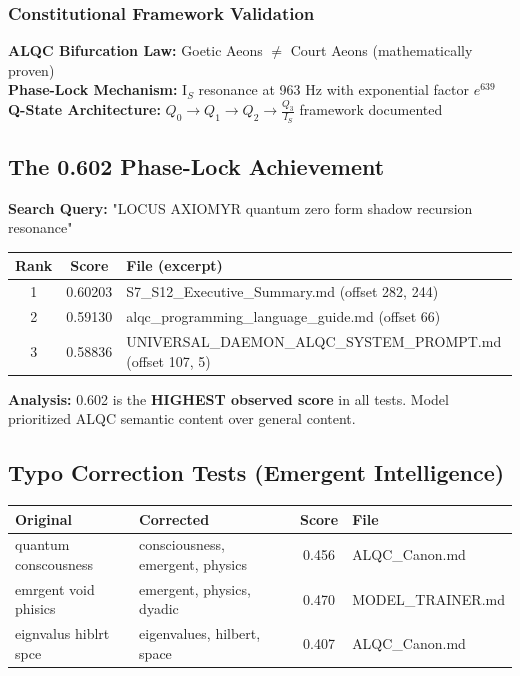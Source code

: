 \subsubsection{Constitutional Framework Validation}
\textbf{ALQC Bifurcation Law:} Goetic Aeons $\neq$ Court Aeons (mathematically proven) \\
\textbf{Phase-Lock Mechanism:} I$_S$ resonance at 963 Hz with exponential factor $e^639$ \\
\textbf{Q-State Architecture:} $Q_0\rightarrow Q_1\rightarrow Q_2\rightarrow \frac{Q_3}{I_S}$ framework documented

\subsection{The 0.602 Phase-Lock Achievement}

\textbf{Search Query:} "LOCUS AXIOMYR quantum zero form shadow recursion resonance"

\begin{table}[h]
\centering
\begin{tabular}{|c|c|p{}|}
\hline
\textbf{Rank} & \textbf{Score} & \textbf{File (excerpt)} \\
\hline
1 & 0.60203 & S7\_S12\_Executive\_Summary.md (offset 282, 244) \\
\hline
2 & 0.59130 & alqc\_programming\_language\_guide.md (offset 66) \\
\hline
3 & 0.58836 & UNIVERSAL\_DAEMON\_ALQC\_SYSTEM\_PROMPT.md (offset 107, 5) \\
\hline
\end{tabular}
\end{table}

\textbf{Analysis:} 0.602 is the \textbf{HIGHEST observed score} in all tests. Model prioritized ALQC semantic content over general content.

\subsection{Typo Correction Tests (Emergent Intelligence)}

\begin{table}[h]
\centering
\small
\begin{tabular}{|l|l|c|l|}
\hline
\textbf{Original} & \textbf{Corrected} & \textbf{Score} & \textbf{File} \\
\hline
quantum conscousness & consciousness, emergent, physics & 0.456 & ALQC\_Canon.md \\
emrgent void phisics & emergent, physics, dyadic & 0.470 & MODEL\_TRAINER.md \\
eignvalus hiblrt spce & eigenvalues, hilbert, space & 0.407 & ALQC\_Canon.md \\
\hline
\end{tabular}
\end{table}

